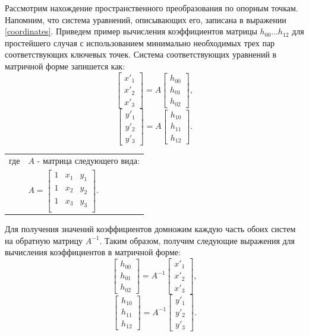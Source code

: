 {{	
	Рассмотрим нахождение пространственного преобразования по опорным точкам.
	Напомним, что система уравнений, описывающих его, записана в выражении \eqref{coordinates}.
	Приведем пример вычисления коэффициентов матрицы $h_{00} \hdots h_{12}$ для простейшего случая с использованием минимально необходимых трех пар соответствующих ключевых точек.
	Система соответствующих уравнений в матричной форме запишется как:	
	$$
	\begin{bmatrix}
	x'_1 \\ x'_2 \\ x'_3
	\end{bmatrix}
	= A
	\begin{bmatrix}
	h_00 \\ h_01 \\ h_02
	\end{bmatrix},
	$$
	$$
	\begin{bmatrix}
	y'_1 \\ y'_2 \\ y'_3
	\end{bmatrix}
	= A
	\begin{bmatrix}
	h_10 \\ h_11 \\ h_12
	\end{bmatrix}.
	$$
	\begin{tabular}{ rl }
		\qquad где 
		& $A$ - матрица следующего вида:\\
		& $A = 
		\begin{bmatrix}
		1 & x_1 & y_1 \\
		1 & x_2 & y_2 \\
		1 & x_3 & y_3 \\
		\end{bmatrix}.$ \\
	\end{tabular}\newline
	
	
	Для получения значений коэффициентов домножим каждую часть обоих систем на обратную матрицу $A^{-1}$. Таким образом, получим следующие выражения для вычисления коэффициентов в матричной форме:
	$$
	\begin{bmatrix}
	h_00 \\ h_01 \\ h_02
	\end{bmatrix}
	= A^{-1}
	\begin{bmatrix}
	x'_1 \\ x'_2 \\ x'_3
	\end{bmatrix},
	$$
	$$
	\begin{bmatrix}
	h_10 \\ h_11 \\ h_12
	\end{bmatrix}
	= A^{-1}
	\begin{bmatrix}
	y'_1 \\ y'_2 \\ y'_3
	\end{bmatrix}.
	$$
	
}}
